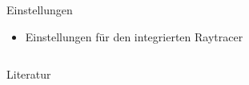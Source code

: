 \documentclass[final,hyperref={pdfpagelabels=false}]{beamer}
\begin{document}
\begin{frame}[t]
\begin{columns}[t]
\begin{column}{.465\textwidth}
\begin{block}{Einstellungen}
   
   
   
   
   
   \begin{itemize}
   \item Einstellungen für den integrierten Raytracer
   \end{itemize}
   
     
   
   
\end{block}


\end{column} %



\begin{column}{.025\textwidth}\end{column} %

\end{columns} %








\nocite{*}

\begin{block}{Literatur}
  
  \nocite{pries:19}
  
\end{block}

\end{frame} %
\end{document}
